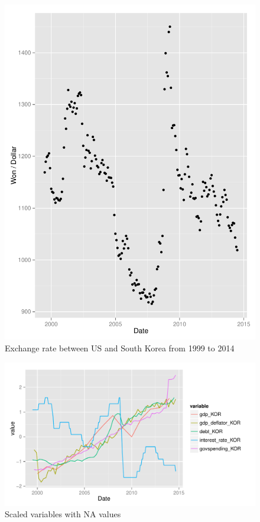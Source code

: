 \documentclass[12pt]{article}
\begin{document}
\begin{figure}
  \centering
    \includegraphics{exchange_rate.pdf}
  \caption{Exchange rate between US and South Korea from 1999 to 2014}
  \label{fig:exchange_rate}
\end{figure}

\begin{figure}
  \centering
    \includegraphics{na_plot_KOR.pdf}
  \caption{Scaled variables with NA values}
  \label{fig:na_plot_KOR}
\end{figure}
\end{document}
